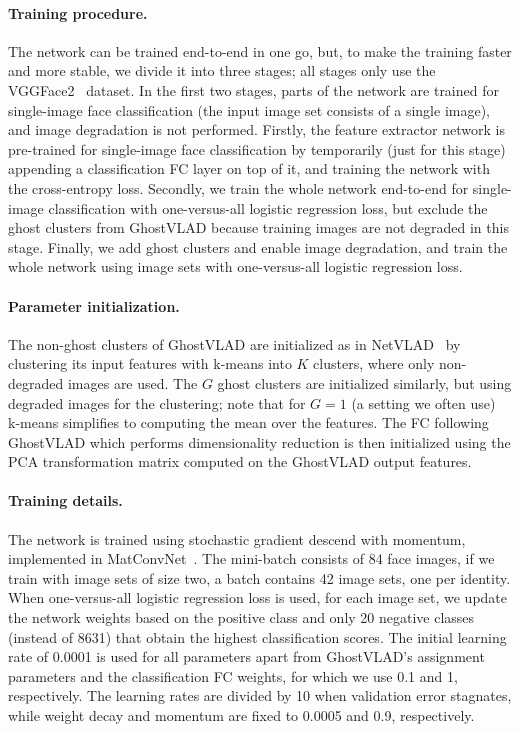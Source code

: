 \documentclass[runningheads]{llncs}
\begin{document}
\paragraph{Training procedure.}
The network can be trained 
end-to-end in one go, but, to make the training faster and
more stable, we divide it
into three stages; all stages only use the VGGFace2~\cite{Cao18}
dataset.
In the first two stages, parts of the network are trained
for single-image face classification
(\ie the input image set consists of a single image),
and image degradation is not performed.
Firstly, the feature extractor network
is pre-trained for single-image face classification
by temporarily (just for this stage)
appending a classification FC layer on top of it,
and training the network with the cross-entropy loss.
Secondly, we train the whole network
end-to-end for single-image classification
with one-versus-all logistic regression loss,
but exclude the ghost clusters from GhostVLAD
because training images are not degraded in this stage.
Finally, we add ghost clusters and enable image degradation,
and train the whole network using image
sets with one-versus-all logistic regression loss.

\paragraph{Parameter initialization.}
The non-ghost clusters of GhostVLAD are initialized
as in NetVLAD~\cite{Arandjelovic16} by clustering
its input features with k-means into $K$ clusters,
where only non-degraded images are used.
The $G$ ghost clusters are initialized similarly, but using
degraded images for the clustering;
note that for $G=1$ (a setting we often use)
k-means simplifies to computing the mean over the features.
The FC following GhostVLAD which performs dimensionality reduction
is then initialized using 
the PCA transformation matrix computed on the 
GhostVLAD output features.

\paragraph{Training details.}
The network is trained using stochastic gradient 
descend with momentum,
implemented in MatConvNet~\cite{Vedaldi15}.
The mini-batch consists of 84 face images,
\ie if we train with image sets of size two,
a batch contains 42 image sets, one per identity.
When  
one-versus-all logistic regression loss is used,
for each image set, we update the network weights 
based on the positive class and only 20 negative 
classes (instead of 8631) that 
obtain the highest classification scores.
The initial learning rate of 0.0001 is used for all
parameters apart from GhostVLAD's assignment parameters
and the classification FC weights,
for which we use 0.1 and 1, respectively.
%
The learning rates are divided by 10 when validation error stagnates,
while weight decay and momentum are fixed to 0.0005 and 0.9,
respectively.
\end{document}
